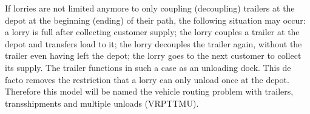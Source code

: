 %
%

%

If lorries are not limited anymore to only coupling (decoupling) trailers at the depot at the beginning (ending) of their path, the following situation may occur:
a lorry is full after collecting customer supply;
 the lorry couples a trailer at the depot and transfers load to it; the lorry decouples the trailer again, without the trailer even having left the depot; the lorry goes to the next customer to collect its supply.
The trailer functions in such a case as an unloading dock.
This de facto removes the restriction that a lorry can only unload once at the depot.
Therefore this model will be named the vehicle routing problem with trailers, transshipments and multiple unloads (VRPTTMU). \\


